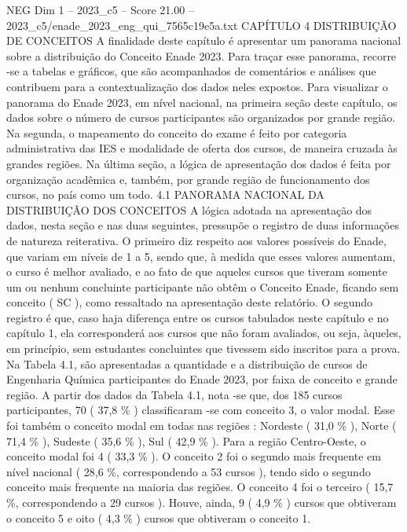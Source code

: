\begin{textsample}{NEG Dim 1 – 2023\_c5 – Score 21.00 – 2023\_c5/enade\_2023\_eng\_qui\_7565c19e5a.txt}  \label{ex:f1_neg_429}
CAPÍTULO 4 DISTRIBUIÇÃO DE CONCEITOS A finalidade deste capítulo é apresentar um panorama nacional sobre a distribuição do Conceito Enade 2023.
Para traçar esse panorama, recorre -se a tabelas e gráficos, que são acompanhados de comentários e análises que contribuem para a contextualização dos dados neles expostos.
Para visualizar o panorama do Enade 2023, em nível nacional, na primeira seção deste capítulo, os dados sobre o número de cursos participantes são organizados por grande região.
Na segunda, o mapeamento do conceito do exame é feito por categoria administrativa das IES e modalidade de oferta dos cursos, de maneira cruzada às grandes regiões.
Na última seção, a lógica de apresentação dos dados é feita por organização acadêmica e, também, por grande região de funcionamento dos cursos, no país como um todo. 4.1 PANORAMA NACIONAL DA DISTRIBUIÇÃO DOS CONCEITOS A lógica adotada na apresentação dos dados, nesta seção e nas duas seguintes, pressupõe o registro de duas informações de natureza reiterativa.
O primeiro diz respeito aos valores possíveis do Enade, que variam em níveis de 1 a 5, sendo que, à medida que esses valores aumentam, o curso é melhor avaliado, e ao fato de que aqueles cursos que tiveram somente um ou nenhum concluinte participante não obtêm o Conceito Enade, ficando sem conceito ( SC ), como ressaltado na apresentação deste relatório.
O segundo registro é que, caso haja diferença entre os cursos tabulados neste capítulo e no capítulo 1, ela corresponderá aos cursos que não foram avaliados, ou seja, àqueles, em princípio, sem estudantes concluintes que tivessem sido inscritos para a prova.
Na Tabela 4.1, são apresentadas a quantidade e a distribuição de cursos de Engenharia Química participantes do Enade 2023, por faixa de conceito e grande região.
A partir dos dados da Tabela 4.1, nota -se que, dos 185 cursos participantes, 70 ( 37,8 \% ) classificaram -se com conceito 3, o valor modal.
Esse foi também o conceito modal em todas nas regiões : Nordeste ( 31,0 \% ), Norte ( 71,4 \% ), Sudeste ( 35,6 \% ), Sul ( 42,9 \% ).
Para a região Centro-Oeste, o conceito modal foi 4 ( 33,3 \% ).
O conceito 2 foi o segundo mais frequente em nível nacional ( 28,6 \%, correspondendo a 53 cursos ), tendo sido o segundo conceito mais frequente na maioria das regiões.
O conceito 4 foi o terceiro ( 15,7 \%, correspondendo a 29 cursos ).
Houve, ainda, 9 ( 4,9 \% ) cursos que obtiveram o conceito 5 e oito ( 4,3 \% ) cursos que obtiveram o conceito 1.

\end{textsample}

